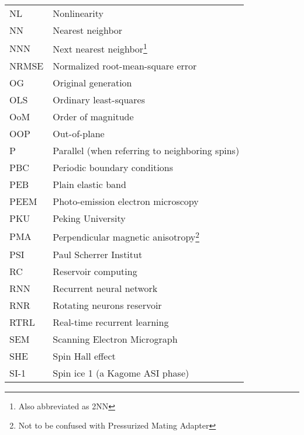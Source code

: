 {\begin{longtable}[l]{ll}
        NL    & Nonlinearity                                \\
        NN    & Nearest neighbor                            \\
        NNN   & Next nearest neighbor\footnote{Also abbreviated as 2NN} \\ %
        NRMSE & Normalized root-mean-square error           \\
        OG    & Original generation                         \\
        OLS   & Ordinary least-squares                      \\
        OoM   & Order of magnitude                          \\
        OOP   & Out-of-plane                                \\
        P     & Parallel (when referring to neighboring spins) \\
        PBC   & Periodic boundary conditions                \\
        PEB   & Plain elastic band                          \\
        PEEM  & Photo-emission electron microscopy          \\
        PKU   & Peking University                           \\
        PMA   & Perpendicular magnetic anisotropy\footnote{Not to be confused with Pressurized Mating Adapter} \\
        PSI   & Paul Scherrer Institut                      \\
        RC    & Reservoir computing                         \\
        RNN   & Recurrent neural network                    \\
        RNR   & Rotating neurons reservoir                  \\
        RTRL  & Real-time recurrent learning                \\
        SEM   & Scanning Electron Micrograph                \\
        SHE   & Spin Hall effect~\cite{SHE}                 \\ %
        SI-1  & Spin ice 1 (a Kagome ASI phase)             \\

\end{longtable}}
